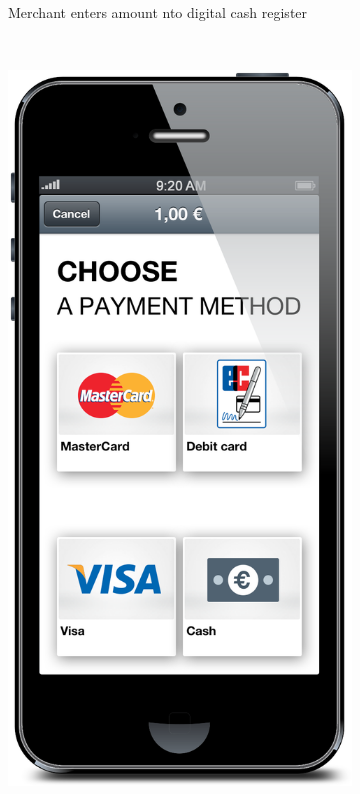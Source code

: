 \documentclass[a4paper, oneside]{csthesis}
\begin{document}
\begin{figure}
\begin{subfigure}[b]{0.22\textwidth}
                \caption{Merchant enters amount nto digital cash register}
                \label{fig:flow1}
        \end{subfigure}%
        ~ %
        \begin{subfigure}[b]{0.22\textwidth}
                \centering
                \includegraphics[width=\textwidth]{figures/flow2.png}

\end{subfigure}
\end{figure}
\end{document}
